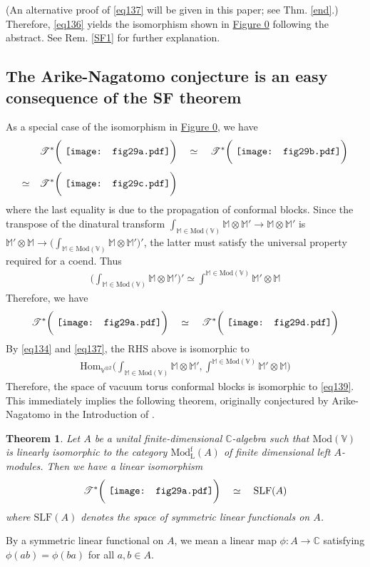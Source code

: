\documentclass[11pt,b5paper,notitlepage]{article}
\theoremstyle{definition}
\theoremstyle{plain}
\newtheorem{thm}[df]{Theorem}
\newcommand{\Hom}{\mathrm{Hom}}
\newcommand{\SLF}{\mathrm{SLF}}
\newcommand{\Vbb}{\mathbb V}
\newcommand{\Mbb}{\mathbb M}
\newcommand{\Cbb}{\mathbb C}
\newcommand{\<}{\left\langle}
\renewcommand{\>}{\right\rangle}
\newcommand{\ST}{\mathscr{T}}
\newcommand{\Mod}{\mathrm{Mod}}
\newcommand{\ModfL}{\mathrm{Mod}^{\mathrm f}_{\mathrm L}}
\numberwithin{equation}{section}
\begin{document}
(An alternative proof of \eqref{eq137} will be given in this paper; see Thm. \ref{end}.) Therefore, \eqref{eq136} yields the isomorphism shown in \hyperlink{figsfend}{Figure 0} following the abstract. See Rem. \ref{SF1} for further explanation.


\subsection{The Arike-Nagatomo conjecture is an easy consequence of the SF theorem}\label{lb80}


As a special case of the isomorphism in \hyperlink{figsfend}{Figure 0}, we have
\begin{align*}
&\ST^*\bigg(\vcenter{\hbox{{
		\texttt{[image: fig29a.pdf]}}}}\bigg)\quad\simeq\quad\ST^*\bigg(\vcenter{\hbox{{
		\texttt{[image: fig29b.pdf]}}}}\bigg)\\[1ex]
\simeq\quad&\ST^*\bigg(\vcenter{\hbox{{
		\texttt{[image: fig29c.pdf]}}}}\bigg)
\end{align*}
where the last equality is due to the propagation of conformal blocks. Since the transpose of the dinatural transform $\int_{\Mbb\in\Mod(\Vbb)}\Mbb\otimes\Mbb'\rightarrow\Mbb\otimes\Mbb'$ is $\Mbb'\otimes\Mbb\rightarrow\big(\int_{\Mbb\in\Mod(\Vbb)}\Mbb\otimes\Mbb'\big)'$, the latter must satisfy the universal property required for a coend. Thus
\begin{align*}
\Big(\int_{\Mbb\in\Mod(\Vbb)}\Mbb\otimes\Mbb'\Big)'\simeq\int^{\Mbb\in\Mod(\Vbb)}\Mbb'\otimes\Mbb
\end{align*}
Therefore, we have
\begin{align*}
\ST^*\bigg(\vcenter{\hbox{{
		\texttt{[image: fig29a.pdf]}}}}\bigg)\quad\simeq\quad\ST^*\bigg(\vcenter{\hbox{{
		\texttt{[image: fig29d.pdf]}}}}\bigg)
\end{align*}
By \eqref{eq134} and \eqref{eq137}, the RHS above is isomorphic to
\begin{align}\label{eq139}
\Hom_{\Vbb^{\otimes2}}\Big(\int_{\Mbb\in\Mod(\Vbb)}\Mbb\otimes\Mbb',\int^{\Mbb\in\Mod(\Vbb)}\Mbb'\otimes\Mbb\Big)
\end{align}
Therefore, the space of vacuum torus conformal blocks is isomorphic to \eqref{eq139}. This immediately implies the following theorem, originally conjectured by Arike-Nagatomo in the Introduction of \cite{AN-pseudo-trace}.

\begin{thm}\label{lb78}
Let $A$ be a unital finite-dimensional $\Cbb$-algebra such that $\Mod(\Vbb)$ is linearly isomorphic to the category $\ModfL(A)$ of finite dimensional left $A$-modules. Then we have a linear isomorphism
\begin{align}\label{eq140}
\ST^*\bigg(\vcenter{\hbox{{
		\texttt{[image: fig29a.pdf]}}}}\bigg)\quad\simeq\quad\SLF(A)
\end{align}
where $\SLF(A)$ denotes the space of symmetric linear functionals on $A$.
\end{thm}
By a symmetric linear functional on $A$, we mean a linear map $\phi:A\rightarrow\Cbb$ satisfying $\phi(ab)=\phi(ba)$ for all $a,b\in A$.
\end{document}
